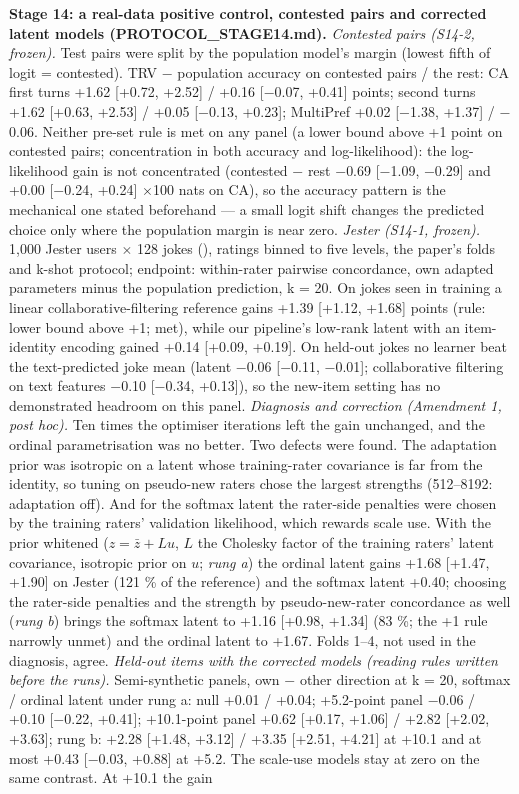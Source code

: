 \documentclass{article}
\begin{document}
\textbf{Stage 14: a real-data positive control, contested pairs and corrected latent models (PROTOCOL\_STAGE14.md).} \emph{Contested pairs (S14-2, frozen).} Test pairs were split by the population model's margin (lowest fifth of \textbar logit\textbar{} = contested). TRV $-$ population accuracy on contested pairs / the rest: CA first turns +1.62 {[}+0.72, +2.52{]} / +0.16 {[}$-$0.07, +0.41{]} points; second turns +1.62 {[}+0.63, +2.53{]} / +0.05 {[}$-$0.13, +0.23{]}; MultiPref +0.02 {[}$-$1.38, +1.37{]} / $-$0.06. Neither pre-set rule is met on any panel (a lower bound above +1 point on contested pairs; concentration in both accuracy and log-likelihood): the log-likelihood gain is not concentrated (contested $-$ rest $-$0.69 {[}$-$1.09, $-$0.29{]} and +0.00 {[}$-$0.24, +0.24{]} $\times$100 nats on CA), so the accuracy pattern is the mechanical one stated beforehand --- a small logit shift changes the predicted choice only where the population margin is near zero. \emph{Jester (S14-1, frozen).} 1,000 Jester users $\times$ 128 jokes (\citealp{goldberg2001eigentaste}), ratings binned to five levels, the paper's folds and k-shot protocol; endpoint: within-rater pairwise concordance, own adapted parameters minus the population prediction, k = 20. On jokes seen in training a linear collaborative-filtering reference gains +1.39 {[}+1.12, +1.68{]} points (rule: lower bound above +1; met), while our pipeline's low-rank latent with an item-identity encoding gained +0.14 {[}+0.09, +0.19{]}. On held-out jokes no learner beat the text-predicted joke mean (latent $-$0.06 {[}$-$0.11, $-$0.01{]}; collaborative filtering on text features $-$0.10 {[}$-$0.34, +0.13{]}), so the new-item setting has no demonstrated headroom on this panel. \emph{Diagnosis and correction (Amendment 1, post hoc).} Ten times the optimiser iterations left the gain unchanged, and the ordinal parametrisation was no better. Two defects were found. The adaptation prior was isotropic on a latent whose training-rater covariance is far from the identity, so tuning on pseudo-new raters chose the largest strengths (512--8192: adaptation off). And for the softmax latent the rater-side penalties were chosen by the training raters' validation likelihood, which rewards scale use. With the prior whitened (\(z = \bar z + Lu\), \(L\) the Cholesky factor of the training raters' latent covariance, isotropic prior on \(u\); \emph{rung a}) the ordinal latent gains +1.68 {[}+1.47, +1.90{]} on Jester (121 \% of the reference) and the softmax latent +0.40; choosing the rater-side penalties and the strength by pseudo-new-rater concordance as well (\emph{rung b}) brings the softmax latent to +1.16 {[}+0.98, +1.34{]} (83 \%; the +1 rule narrowly unmet) and the ordinal latent to +1.67. Folds 1--4, not used in the diagnosis, agree. \emph{Held-out items with the corrected models (reading rules written before the runs).} Semi-synthetic panels, own $-$ other direction at k = 20, softmax / ordinal latent under rung a: null +0.01 / +0.04; +5.2-point panel $-$0.06 / +0.10 {[}$-$0.22, +0.41{]}; +10.1-point panel +0.62 {[}+0.17, +1.06{]} / +2.82 {[}+2.02, +3.63{]}; rung b: +2.28 {[}+1.48, +3.12{]} / +3.35 {[}+2.51, +4.21{]} at +10.1 and at most +0.43 {[}$-$0.03, +0.88{]} at +5.2. The scale-use models stay at zero on the same contrast. At +10.1 the gain 
\end{document}
